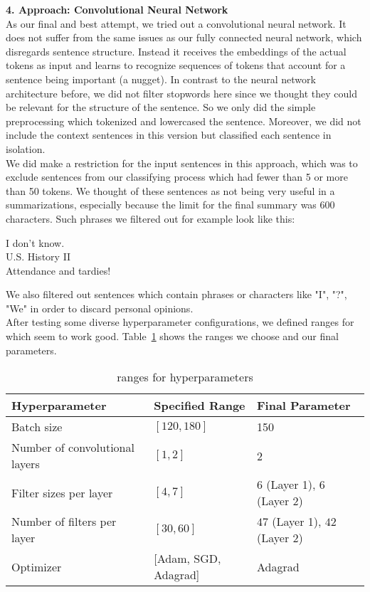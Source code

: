 \textbf{4. Approach: Convolutional Neural Network}\\
As our final and best attempt, we tried out a convolutional neural network.  It does not suffer from the same issues as our fully connected neural network, which disregards sentence structure. Instead it receives the embeddings of the actual tokens as input and learns to recognize sequences of tokens that account for a sentence being important (a nugget). In contrast to the neural network architecture before, we did not filter stopwords here since we thought they could be relevant for the structure of the sentence. So we only did the simple preprocessing which tokenized and lowercased the sentence. Moreover, we did not include the context sentences in this version but classified each sentence in isolation. \\
We did make a restriction for the input sentences in this approach, which was to exclude sentences from our classifying process which had fewer than 5 or more than 50 tokens. We thought of these sentences as not being very useful in a summarizations, especially because the limit for the final summary was 600 characters. Such phrases we filtered out for example look like this:
\begin{center}
I don't know.\\
U.S. History II\\
Attendance and tardies!
\end{center}


We also filtered out sentences which contain phrases or characters like "I", "?", "We" in order to discard personal opinions.\\
After testing some diverse hyperparameter configurations, we defined ranges for which seem to work good. Table~\ref{tab:step1hyperhyper} shows the ranges we choose and our final parameters. 

\begin{table}[H]
	\centering
	\begin{tabularx}{\textwidth}{l|XX } \toprule
		Hyperparameter & Specified Range & Final Parameter \\ \midrule
		Batch size & $[120, 180]$ & 150 \\
		Number of convolutional layers & $[1, 2]$ & 2 \\
		Filter sizes per layer & $[4, 7]$ & $6$ (Layer 1), $6$ (Layer 2) \\
		Number of filters per layer & $[30, 60]$ & $47$ (Layer 1), $42$ (Layer 2) \\
		Optimizer & [Adam, SGD, Adagrad] & Adagrad \\ \bottomrule
	\end{tabularx}
	\caption{ranges for hyperparameters}
	\label{tab:step1hyperhyper}
\end{table}

